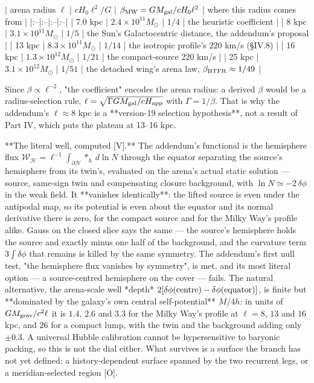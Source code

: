 | arena radius $\ell$ | $cH_0\ell^2/G$ | $\beta_{\rm MW} = GM_{\rm gal}/cH_0\ell^2$ | where this radius comes from |
|:--|:--|:--|:--|
| 7.0 kpc | $2.4\times10^{11}M_\odot$ | $1/4$ | the heuristic coefficient |
| 8 kpc | $3.1\times10^{11}M_\odot$ | $1/5$ | the Sun's Galactocentric distance, the addendum's proposal |
| 13 kpc | $8.3\times10^{11}M_\odot$ | $1/14$ | the isotropic profile's 220 km/s (§IV.8) |
| 16 kpc | $1.3\times10^{12}M_\odot$ | $1/21$ | the compact-source 220 km/s |
| 25 kpc | $3.1\times10^{12}M_\odot$ | $1/51$ | the detached wing's arena law, $\beta_{\rm BTFR}\approx1/49$ |

Since $\beta\propto\ell^{-2}$, "the coefficient" encodes the arena radius: a derived $\beta$ would be a radius-selection rule, $\ell = \sqrt{\Gamma GM_{\rm gal}/cH_{\rm app} }$ with $\Gamma = 1/\beta$. That is why the addendum's $\ell\approx8$ kpc is a **version-19 selection hypothesis**, not a result of Part IV, which puts the plateau at 13–16 kpc.

**The literal well, computed [V].** The addendum's functional is the hemisphere flux $\mathcal W_{\mathcal H} = \ell^{-1}\int_{\partial\mathcal H}*_h\,d\ln N$ through the equator separating the source's hemisphere from its twin's, evaluated on the arena's actual static solution — source, same-sign twin and compensating closure background, with $\ln N\simeq-2\,\delta\phi$ in the weak field. It **vanishes identically**: the lifted source is even under the antipodal map, so its potential is even about the equator and its normal derivative there is zero, for the compact source and for the Milky Way's profile alike. Gauss on the closed slice says the same — the source's hemisphere holds the source and exactly minus one half of the background, and the curvature term $3\int\delta\phi$ that remains is killed by the same symmetry. The addendum's first null test, "the hemisphere flux vanishes by symmetry", is met, and its most literal option — a source-centred hemisphere on the cover — fails. The natural alternative, the arena-scale well *depth* $2[\delta\phi({\rm centre})-\delta\phi({\rm equator})]$, is finite but **dominated by the galaxy's own central self-potential** $M/4h$: in units of $GM_{\rm grav}/c^2\ell$ it is $1.4$, $2.6$ and $3.3$ for the Milky Way's profile at $\ell = 8$, $13$ and $16$ kpc, and $26$ for a compact lump, with the twin and the background adding only $\pm0.3$. A universal Hubble calibration cannot be hypersensitive to baryonic packing, so this is not the dial either. What survives is a surface the branch has not yet defined: a history-dependent surface spanned by the two recurrent legs, or a meridian-selected region [O].

